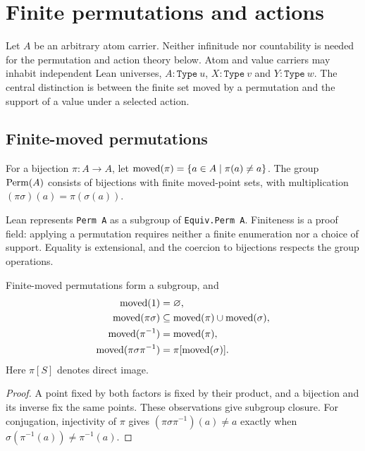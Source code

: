 \section{Finite permutations and actions}
\label{sec:foundations}

Let $A$ be an arbitrary atom carrier. Neither infinitude nor countability
is needed for the permutation and action theory below. Atom and value
carriers may inhabit independent Lean universes,
$A:\texttt{Type}\ u$, $X:\texttt{Type}\ v$ and $Y:\texttt{Type}\ w$.
The central distinction is between the finite set moved by a permutation
and the support of a value under a selected action.

\subsection{Finite-moved permutations}
\label{sec:permutations}

\begin{definition}
For a bijection $\pi:A\to A$, let
$\operatorname{moved}(\pi)=\{a\in A\mid\pi(a)\ne a\}$.
The group $\operatorname{Perm}(A)$ consists of bijections with finite moved-point sets,
with multiplication $(\pi\sigma)(a)=\pi(\sigma(a))$.
\end{definition}

Lean represents \texttt{Perm A} as a subgroup of \texttt{Equiv.Perm A}.
Finiteness is a proof field: applying a permutation
requires neither a finite enumeration nor a choice of support. Equality
is extensional, and the coercion to bijections respects the group operations.

\begin{proposition}
\label{prop:subgroup}
Finite-moved permutations form a subgroup, and
\begin{align}
  \operatorname{moved}(1)&=\varnothing,\label{eq:moved-one}\\
  \operatorname{moved}(\pi\sigma)&\subseteq\operatorname{moved}(\pi)\cup\operatorname{moved}(\sigma),
    \label{eq:moved-mul}\\
  \operatorname{moved}(\pi^{-1})&=\operatorname{moved}(\pi),\label{eq:moved-inverse}\\
  \operatorname{moved}(\pi\sigma\pi^{-1})&=\pi[\operatorname{moved}(\sigma)].
    \label{eq:moved-conj}
\end{align}
Here $\pi[S]$ denotes direct image.
\end{proposition}

\begin{proof}
A point fixed by both factors is fixed by their product, and a bijection
and its inverse fix the same points. These observations give subgroup
closure. For conjugation, injectivity of $\pi$ gives
$(\pi\sigma\pi^{-1})(a)\ne a$ exactly when
$\sigma(\pi^{-1}(a))\ne\pi^{-1}(a)$.
\end{proof}

